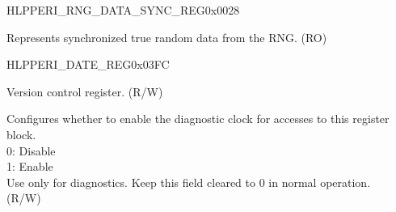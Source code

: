\begin{register}{H}{LPPERI\_RNG\_DATA\_SYNC\_REG}{0x0028}\label{regdesc:LPPERIRNGDATASYNCREG}
%
\regnewline%
\begin{regdesc}\begin{reglist}
\label{fielddesc:LPPERIRNDSYNCDATA}\item [LPPERI\_RND\_SYNC\_DATA] Represents synchronized true random data from the RNG. (RO)
\end{reglist}\end{regdesc}
\end{register}


\begin{register}{H}{LPPERI\_DATE\_REG}{0x03FC}\label{regdesc:LPPERIDATEREG}
%
%
\regnewline%
\begin{regdesc}\begin{reglist}
\label{fielddesc:LPPERILPPERIDATE}\item [LPPERI\_LPPERI\_DATE] Version control register. (R/W)
\label{fielddesc:LPPERICLKEN}\item [LPPERI\_CLK\_EN] Configures whether to enable the diagnostic clock for accesses to this register block.\\
0: Disable\\
1: Enable\\
Use only for diagnostics. Keep this field cleared to 0 in normal operation.\\
(R/W)
\end{reglist}\end{regdesc}
\end{register}

